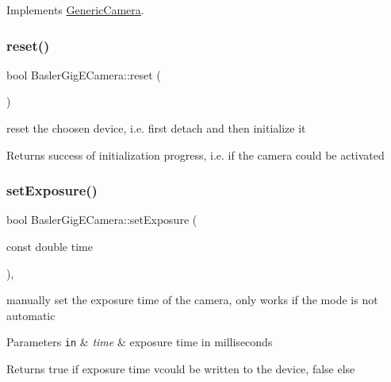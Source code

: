 Implements \hyperlink{class_generic_camera_a393e01ba0b1bc18ad43f00cc62ccea4e}{Generic\+Camera}.

\mbox{\label{class_basler_gig_e_camera_ad1f9154be71d1dba2e456fc404198774}} 
\subsubsection{\texorpdfstring{reset()}{reset()}}
{\footnotesize\ttfamily bool Basler\+Gig\+E\+Camera\+::reset (\begin{DoxyParamCaption}{ }\end{DoxyParamCaption})}

reset the choosen device, i.\+e. first detach and then initialize it \begin{DoxyReturn}{Returns}
success of initialization progress, i.\+e. if the camera could be activated 
\end{DoxyReturn}
\mbox{\label{class_basler_gig_e_camera_a99f9cd699aac5cb1025cb7086fbba7c0}} 
\subsubsection{\texorpdfstring{set\+Exposure()}{setExposure()}}
{\footnotesize\ttfamily bool Basler\+Gig\+E\+Camera\+::set\+Exposure (\begin{DoxyParamCaption}\item[{const double}]{time }\end{DoxyParamCaption})\hspace{0.3cm}{\ttfamily [override]}, {\ttfamily [virtual]}}

manually set the exposure time of the camera, only works if the mode is not automatic 
\begin{DoxyParams}[1]{Parameters}
\mbox{\tt in}  & {\em time} & exposure time in milliseconds \\
\hline
\end{DoxyParams}
\begin{DoxyReturn}{Returns}
true if exposure time vcould be written to the device, false else 
\end{DoxyReturn}



